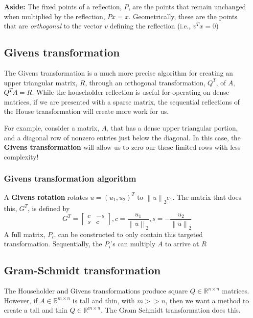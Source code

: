 \documentclass{article}
\newcommand{\norm}[2]{\left\lVert#1\right\rVert_#2}
\begin{document}
\noindent \textbf{Aside:} The fixed points of a reflection, $P$, are the points that remain unchanged when multiplied by the reflection, $Px=x$. Geometrically, these are the points that are \textit{orthogonal} to the vector $v$ defining the reflection (i.e., $v^Tx=0$)


\subsection{Givens transformation}
The Givens transformation is a much more precise algorithm for creating an upper triangular matrix, $R$, through an orthogonal transformation, $Q^T$, of $A$, $Q^TA=R$. While the householder reflection is useful for operating on dense matrices, if we are presented with a sparse matrix, the sequential reflections of the House transformation will create more work for us.

For example, consider a matrix, $A$, that has a dense upper triangular portion, and a diagonal row of nonzero entries just below the diagonal. In this case, the \textbf{Givens transformation} will allow us to zero our these limited rows with less complexity!

\subsubsection{Givens transformation algorithm}
A \textbf{Givens rotation} rotates $u = (u_1, u_2)^T$ to $\norm{u}{2}e_1$. The matrix that does this, $G^T$, is defined by
\begin{equation*}
    G^T = \begin{bmatrix} c & -s \\ s & c \end{bmatrix}, c = \frac{u_1}{\norm{u}{2}}, s = -\frac{u_2}{\norm{u}{2}}
\end{equation*}
A full matrix, $P_i$, can be constructed to only contain this targeted transformation. Sequentially, the $P_i$'s can multiply $A$ to arrive at $R$

\subsection{Gram-Schmidt transformation}
The Householder and Givens transformations produce square $Q \in \mathbb{R}^{n\times n}$ matrices. However, if $A \in \mathbb{R}^{m\times n}$ is tall and thin, with $m >> n$, then we want a method to create a tall and thin $Q \in \mathbb{R}^{m\times n}$. The Gram Schmidt transformation does this.
\end{document}
